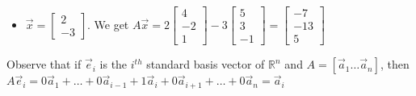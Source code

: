 \documentclass[10pt,letter]{article}
\begin{document}
\begin{itemize}
    \item $\vec{x}=\begin{bmatrix}2\\-3\end{bmatrix}$. We get $A\vec{x}=2\begin{bmatrix}4\\-2\\1\end{bmatrix}-3\begin{bmatrix}5\\3\\-1\end{bmatrix} = \begin{bmatrix}-7\\-13\\5\end{bmatrix}$ 
\end{itemize} 
Observe that if $\vec{e}_i$ is the $i^{th}$ standard basis vector of $\mathbb{R}^n$ and $A=[\vec{a}_1\ldots\vec{a}_n]$, then $A\vec{e}_i=0\vec{a}_1+\ldots+0\vec{a}_{i-1}+1\vec{a}_i+0\vec{a}_{i+1}+\ldots+0\vec{a}_n=\vec{a}_i$ 
\end{document}
